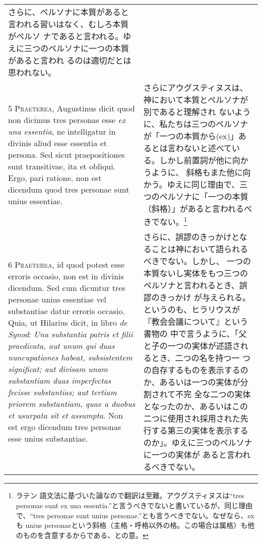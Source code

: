 \documentclass[10pt]{jsarticle} %
\begin{document}
\begin{longtable}{p{21em}p{21em}}
さらに、ペルソナに本質があると言われる習いはなく、むしろ本質がペルソ
 ナであると言われる。ゆえに三つのペルソナに一つの本質があると言われ
 るのは適切だとは思われない。

\\



5 {\scshape Praeterea}, Augustinus dicit quod non dicimus tres personas esse {\itshape ex una
essentia}, ne intelligatur in divinis aliud esse essentia et persona. Sed
sicut praepositiones sunt transitivae, ita et obliqui. Ergo, pari
ratione, non est dicendum quod tres personae sunt unius essentiae.

&

さらにアウグスティヌスは、神において本質とペルソナが別であると理解され
 ないように、私たちは三つのペルソナが「一つの本質から(ex)」あるとは言わないと述べている。しかし前置詞が他に向かうように、
 斜格もまた他に向かう。ゆえに同じ理由で、三つのペルソナに「一つの本質（斜格）」があると言われるべきでない。\footnote{ラテン
 語文法に基づいた論なので翻訳は至難。アウグスティヌスは``tres personae sunt ex una
 essentia.''と言うべきでないと書いているが、同じ理由で、``tres
 personae sunt unius personae.''とも言うべきでない。なぜなら、exも
 unius personaeという斜格（主格・呼格以外の格。この場合は属格）も他のものを含意するからである、との意。 }

\\

6 {\scshape Praeterea}, id quod potest esse erroris occasio, non est in divinis
dicendum. Sed cum dicuntur tres personae unius essentiae vel substantiae
datur erroris occasio. Quia, ut Hilarius dicit, in libro {\itshape de Synod}: {\itshape Una
substantia patris et filii praedicata, aut unum qui duas nuncupationes
habeat, subsistentem significat; aut divisam unam substantiam duas
imperfectas fecisse substantias; aut tertiam priorem substantiam, quae a
duobus et usurpata sit et assumpta}. Non est ergo dicendum tres personas
esse unius substantiae.


&

さらに、誤謬のきっかけとなることは神において語られるべきでない。しかし、
 一つの本質ないし実体をもつ三つのペルソナと言われるとき、誤謬のきっかけ
 が与えられる。というのも、ヒラリウスが『教会会議について』という書物の
 中で言うように、「父と子の一つの実体が述語されるとき、二つの名を持つ一
 つの自存するものを表示するのか、あるいは一つの実体が分割されて不完
 全な二つの実体となったのか、あるいはこの二つに使用され採用された先
 行する第三の実体を表示するのか」。ゆえに三つのペルソナに一つの実体が
 あると言われるべきでない。


\end{longtable}
\end{document}
